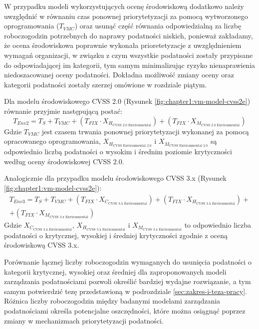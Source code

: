 \bigbreak
W przypadku modeli wykorzystujących ocenę środowiskową dodatkowo należy uwzględnić w równaniu czas ponownej priorytetyzacji za pomocą wytworzonego oprogramowania ($T_{VMC}$) oraz usunąć część równania odpowiedzialną za liczbę roboczogodzin potrzebnych do naprawy podatności niskich, ponieważ zakładamy, że ocena środowiskowa poprawnie wykonała prioretetyzacje z uwzględnieniem wymagań organizacji, w związku z czym wszystkie podatności zostały przypisane do odpowiadającej im kategorii, tym samym minimalizując ryzyko nienaprawienia niedoszacowanej oceny podatności. Dokładna możliwość zmiany oceny oraz kategorii podatności zostały szerzej omówione w rozdziale piątym. 

\bigbreak
Dla modelu środowiskowego CVSS 2.0 (Rysunek \ref{fig:chapter1:vm-model-cvss2e}) równanie przyjmie następującą postać:
\begin{equation}
\label{eq:cvss2e}
T_{Env2} = T_S + T_{VMC} + (T_{FIX} \cdot X_{H_\text{CVSS 2.0 Environmental}}) + (T_{FIX} \cdot X_{M_\text{CVSS 2.0 Environmental}})
\end{equation}
Gdzie $T_{VMC}$ jest czasem trwania ponownej priorytetyzacji wykonanej za pomocą opracowanego oprogramowania, $X_{H_\text{CVSS Environmental 2.0}}$ i $X_{M_\text{CVSS Environmental 2.0}}$ są odpowiednio liczbą podatności o wysokim i średnim poziomie krytyczności według oceny środowiskowej CVSS 2.0.

\bigbreak
Analogicznie dla przypadku modelu środowiskowego CVSS 3.x (Rysunek \ref{fig:chapter1:vm-model-cvss2e}):
\begin{multline}
\label{eq:cvss3e}
T_{Env3} = T_S + T_{VMC} + (T_{FIX} \cdot X_{C_\text{CVSS 3.x Environmental}}) + (T_{FIX} \cdot X_{H_\text{CVSS 3.x Environmental}}) + \\
+ (T_{FIX} \cdot X_{M_\text{CVSS 3.x Environmental}})
\end{multline}
Gdzie $X_{C_\text{CVSS 3.x Environmental}}$, $X_{H_\text{CVSS 3.x Environmental}}$ i $X_{M_\text{CVSS 3.x Environmental}}$ to odpowiednio liczba podatności o krytycznej, wysokiej i średniej krytyczności zgodnie z oceną środowiskową CVSS 3.x.

\bigbreak
Porównanie łącznej liczby roboczogodzin wymaganych do usunięcia podatności o kategorii krytycznej, wysokiej oraz średniej dla zaproponowanych modeli zarządzania podatnościami pozwoli określić bardziej wydajne rozwiązanie, a tym samym potwierdzić tezę przedstawioną w podrozdziale \ref{sec:zakres-i-teza-pracy}. Różnica liczby roboczogodzin między badanymi modelami zarządzania podatnościami określa potencjalne oszczędności, które można osiągnąć poprzez zmiany w mechanizmach priorytetyzacji podatności.

